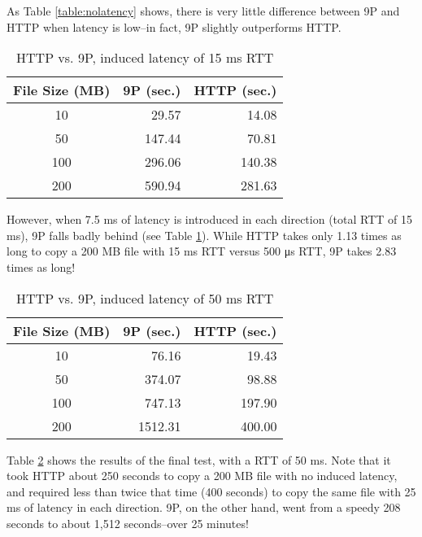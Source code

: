 \documentclass[12pt,american]{report}
\begin{document}
As Table \ref{table:nolatency} shows, there is very little difference between 9P and HTTP when latency is low--in fact, 9P slightly outperforms HTTP.

\begin{table}[h]
	\begin{center}
		\begin{tabular}{ | c || r | r | }
			\hline
			\bf{File Size (MB)} & \bf{9P (sec.)} & \bf{HTTP (sec.)} \\ \hline
			10 & 29.57 & 14.08 \\ \hline
			50 & 147.44 & 70.81 \\ \hline
			100 & 296.06 & 140.38 \\ \hline
			200 & 590.94 & 281.63 \\ \hline		
		\end{tabular}
	\end{center}
	\caption{HTTP vs. 9P, induced latency of 15 ms RTT}
	\label{table:15mslatency}
\end{table}

However, when 7.5 ms of latency is introduced in each direction (total RTT of 15 ms), 9P falls badly behind (see Table \ref{table:15mslatency}). While HTTP takes only 1.13 times as long to copy a 200 MB file with 15 ms RTT versus 500 μs RTT, 9P takes 2.83 times as long!

\begin{table}[h]
	\begin{center}
		\begin{tabular}{ | c || r | r | }
			\hline
			\bf{File Size (MB)} & \bf{9P (sec.)} & \bf{HTTP (sec.)} \\ \hline
			10 & 76.16 & 19.43 \\ \hline
			50 & 374.07 & 98.88 \\ \hline
			100 & 747.13 & 197.90 \\ \hline
			200 & 1512.31 & 400.00 \\ \hline		
		\end{tabular}
	\end{center}
	\caption{HTTP vs. 9P, induced latency of 50 ms RTT}
	\label{table:50mslatency}
\end{table}

Table \ref{table:50mslatency} shows the results of the final test, with a RTT of 50 ms. Note that it took HTTP about 250 seconds to copy a 200 MB file with no induced latency, and required less than twice that time (400 seconds) to copy the same file with 25 ms of latency in each direction. 9P, on the other hand, went from a speedy 208 seconds to about 1,512 seconds--over 25 minutes!
\end{document}
